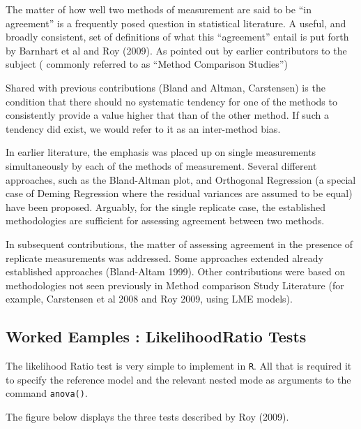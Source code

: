 
The matter of how well two methods of measurement are said to be “in agreement” is a frequently posed question in statistical literature. A useful, and broadly consistent, set of definitions of what this “agreement” entail is put forth by Barnhart et al and Roy (2009). 
As pointed out by earlier contributors to the subject ( commonly referred to as “Method Comparison Studies”)

Shared with previous contributions (Bland and Altman, Carstensen) is the condition that there should no systematic  tendency for one of the methods to consistently provide a value higher that than of the other method. If such a tendency did exist, we would refer to it as an inter-method bias.

In earlier literature, the emphasis was placed up on single measurements simultaneously by each of the methods of measurement. Several different approaches, such as the Bland-Altman plot, and Orthogonal Regression (a special case of Deming Regression where the residual variances are assumed to be equal) have been proposed. Arguably, for the single replicate case, the established methodologies are sufficient for assessing agreement between two methods.

In subsequent contributions, the matter of assessing agreement in the presence  of replicate measurements was addressed. Some approaches extended already established approaches (Bland-Altam 1999).  Other contributions were based on methodologies not seen previously in Method comparison Study Literature  (for example, Carstensen et al 2008 and Roy 2009, using LME models). 

\subsection{Worked Eamples : LikelihoodRatio Tests}


The likelihood Ratio test is very simple to implement in \texttt{R}. All that is required it to specify the reference model and the relevant nested mode as arguments to the command \texttt{anova()}.

The figure below displays the three tests described by Roy (2009).

